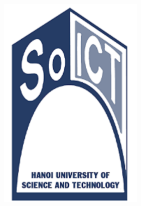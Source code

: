 \documentclass[a0,portrait,11pt]{a0poster}
\begin{document}
\begin{minipage}[b]{0.15\linewidth}
\includegraphics[width=7cm]{soict.png}
\end{minipage}

\vspace{2cm} %

\end{document}
